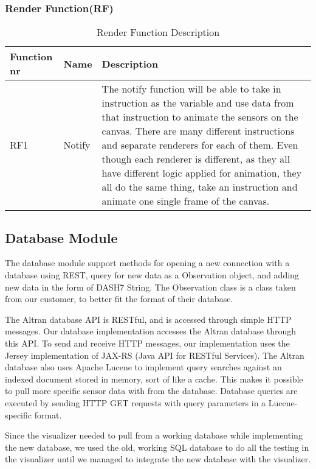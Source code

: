 \documentclass[../document]{subfiles}
\begin{document}
\subsubsection{Render Function(RF)}
\begin{table}[H]
\caption{Render Function Description}
\centering
\begin{tabularx}{\textwidth}{|l|l|X|}
	\hline
	Function nr
	&Name
	&Description
	\\ \hline RF1
	&Notify
	&The notify function will be able to take in instruction as the variable and use data from that instruction to animate the sensors on the canvas. There are many different instructions and separate renderers for each of them. Even though each renderer is different, as they all have different logic applied for animation, they all do the same thing, take an instruction and animate one single frame of the canvas.
	\\ \hline 
\end{tabularx}
\end{table}

\subsection{Database Module}
The database module support methods for opening a new connection with a database using REST, query for new data as a Observation object, and adding new data in the form of DASH7 String. The Observation class is a class taken from our customer, to better fit the format of their database.

The Altran database API is RESTful, and is accessed through simple HTTP messages. Our database implementation accesses the Altran database through this API. To send and receive HTTP messages, our implementation uses the Jersey implementation of JAX-RS (Java API for RESTful Services). The Altran database also uses Apache Lucene to implement query searches against an indexed document stored in memory, sort of like a cache. This makes it possible to pull more specific sensor data with from the database. Database queries are executed by sending HTTP GET requests with query parameters in a Lucene-specific format.

Since the visualizer needed to pull from a working database while implementing the new database, we used the old, working SQL database to do all the testing in the visualizer until we managed to integrate the new database with the visualizer.
\end{document}
